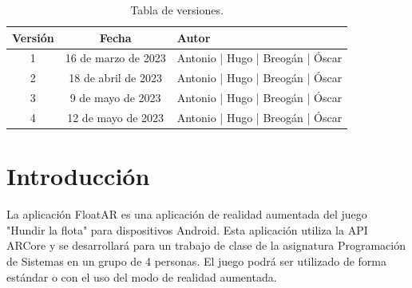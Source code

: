 \documentclass[a4paper, openright, 12pt]{article}
\begin{document}
\newpage



\tableofcontents

\vspace{5cm}

\begin{flushright}
\begin{table}[hbtp]
\begin{center}

\caption{Tabla de versiones.}
\label{tabla:versiones}
\small
\vspace{1ex}

\begin{tabular}{|c|c|l|}
\hline
Versión & Fecha & Autor \\
\hline \hline
1 & 16 de marzo de 2023 & Antonio | Hugo | Breogán | Óscar\\ \hline \hline
2 & 18 de abril de 2023 & Antonio | Hugo | Breogán | Óscar\\ \hline \hline
3 & 9 de mayo de 2023 & Antonio | Hugo | Breogán | Óscar \\ \hline
4 & 12 de mayo de 2023 & Antonio | Hugo | Breogán | Óscar \\ \hline
\end{tabular}

\end{center}
\end{table}
\end{flushright}

\newpage

\section{Introducción}\label{cap.introduccion}
La aplicación FloatAR es una aplicación de realidad aumentada del juego "Hundir la flota" para dispositivos Android. Esta aplicación utiliza la API ARCore y se desarrollará para un trabajo de clase de la asignatura Programación de Sistemas en un grupo de 4 personas. El juego podrá ser utilizado de forma estándar o con el uso del modo de realidad aumentada.
\end{document}
